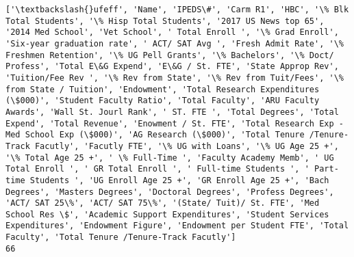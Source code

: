 \documentclass[11pt]{article}
\begin{document}
    \begin{Verbatim}[commandchars=\\\{\}]
['\textbackslash{}ufeff', 'Name', 'IPEDS\#', 'Carm R1', 'HBC', '\% Blk Total Students', '\% Hisp Total Students', '2017 US News top 65', '2014 Med School', 'Vet School', ' Total Enroll ', '\% Grad Enroll', 'Six-year graduation rate', ' ACT/ SAT Avg ', 'Fresh Admit Rate', '\% Freshmen Retention', '\% UG Pell Grants', '\% Bachelors', '\% Doct/ Profess', 'Total E\&G Expend', 'E\&G / St. FTE', 'State Approp Rev', 'Tuition/Fee Rev ', '\% Rev from State', '\% Rev from Tuit/Fees', '\% from State / Tuition', 'Endowment', 'Total Research Expenditures (\$000)', 'Student Faculty Ratio', 'Total Faculty', 'ARU Faculty Awards', 'Wall St. Jourl Rank', ' ST. FTE ', 'Total Degrees', 'Total Expend', 'Total Revenue', 'Enowment / St. FTE', 'Total Research Exp - Med School Exp (\$000)', 'AG Research (\$000)', 'Total Tenure /Tenure-Track Facutly', 'Facutly FTE', '\% UG with Loans', '\% UG Age 25 +', '\% Total Age 25 +', ' \% Full-Time ', 'Faculty Academy Memb', ' UG Total Enroll ', ' GR Total Enroll ', ' Full-time Students ', ' Part-time Students ', 'UG Enroll Age 25 +', 'GR Enroll Age 25 +', 'Bach Degrees', 'Masters Degrees', 'Doctoral Degrees', 'Profess Degrees', 'ACT/ SAT 25\%', 'ACT/ SAT 75\%', '(State/ Tuit)/ St. FTE', 'Med School Res \$', 'Academic Support Expenditures', 'Student Services Expenditures', 'Endowment Figure', 'Endowment per Student FTE', 'Total Faculty', 'Total Tenure /Tenure-Track Facutly']
66

    \end{Verbatim}
\end{document}

